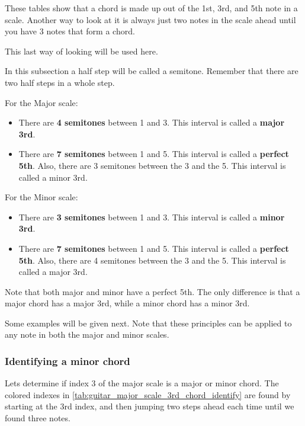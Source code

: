 These tables show that a chord is made up out of the 1st, 3rd, and 5th note in a scale. Another way to look at it is always just two notes in the scale ahead until you have 3 notes that form a chord.

This last way of looking will be used here.

In this subsection a half step will be called a semitone. Remember that there are two half steps in a whole step.

For the Major scale:

\begin{itemize}
	\item There are \textbf{4 semitones} between 1 and 3. This interval is called a \textbf{major 3rd}.
	\item There are \textbf{7 semitones} between 1 and 5. This interval is called a \textbf{perfect 5th}.
		\subitem Also, there are 3 semitones between the 3 and the 5. This interval is called a minor 3rd.
\end{itemize}

For the Minor scale:

\begin{itemize}
	\item There are \textbf{3 semitones} between 1 and 3. This interval is called a \textbf{minor 3rd}.
	\item There are \textbf{7 semitones} between 1 and 5. This interval is called a \textbf{perfect 5th}.
	\subitem Also, there are 4 semitones between the 3 and the 5. This interval is called a major 3rd.
\end{itemize}

Note that both major and minor have a perfect 5th. The only difference is that a major chord has a major 3rd, while a minor chord has a minor 3rd.

Some examples will be given next. Note that these principles can be applied to any note in both the major and minor scales.

\newpage

\subsubsection{Identifying a minor chord}
Lets determine if index 3 of the major scale is a major or minor chord. The colored indexes in \autoref{tab:guitar_major_scale_3rd_chord_identify} are found by starting at the 3rd index, and then jumping two steps ahead each time until we found three notes.

